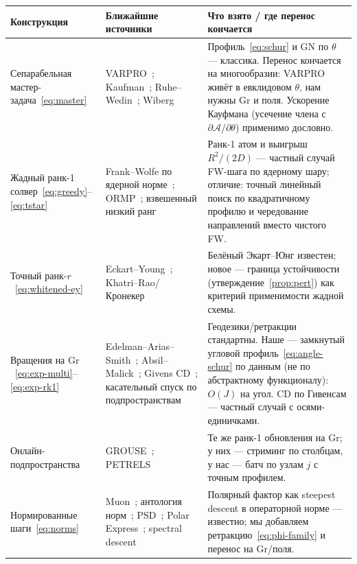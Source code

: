 \documentclass[11pt,a4paper]{article}
\newcommand{\Gr}{\mathrm{Gr}}
\newcommand{\Aop}{\mathcal{A}}
\theoremstyle{plain}
\theoremstyle{definition}
\theoremstyle{remark}
\begin{document}
\begin{center}
\small
\begin{tabularx}{\textwidth}{@{}p{3.6cm}p{4.6cm}X@{}}
\toprule
\textbf{Конструкция} & \textbf{Ближайшие источники} & \textbf{Что взято / где перенос кончается}\\
\midrule
Сепарабельная мастер-задача~\eqref{eq:master}
& VARPRO~\cite{golub-pereyra-1973}; Kaufman~\cite{kaufman-1975};
Ruhe--Wedin~\cite{ruhe-wedin-1980}; Wiberg~\cite{wiberg-1976}
& Профиль~\eqref{eq:schur} и GN по $\theta$ --- классика. Перенос кончается на
многообразии: VARPRO живёт в евклидовом $\theta$, нам нужны $\Gr$ и поля.
Ускорение Кауфмана (усечение члена с $\partial\Aop/\partial\theta$)
применимо дословно.\\[2pt]
Жадный ранк-1 солвер~\eqref{eq:greedy}--\eqref{eq:tstar}
& Frank--Wolfe по ядерной норме~\cite{jaggi-2013};
ORMP~\cite{wang-2014-ormp};
взвешенный низкий ранг~\cite{srebro-jaakkola-2003,mishra-2014}
& Ранк-1 атом и выигрыш $R^2/(2D)$ --- частный случай FW-шага по ядерному
шару; отличие: точный линейный поиск по квадратичному профилю и
чередование направлений вместо чистого FW.\\[2pt]
Точный ранк-$r$~\eqref{eq:whitened-ey}
& Eckart--Young~\cite{eckart-young-1936};
Khatri--Rao/Кронекер~\cite{vanloan-pitsianis-1993}
& Белёный Экарт--Юнг известен; новое --- граница устойчивости
(утверждение~\ref{prop:pert}) как критерий применимости жадной схемы.\\[2pt]
Вращения на $\Gr$~\eqref{eq:exp-multi}--\eqref{eq:exp-rk1}
& Edelman--Arias--Smith~\cite{edelman-1998};
Absil--Malick~\cite{absil-malick-2012};
Givens CD~\cite{shalit-chechik-2014,massart-2022};
касательный спуск по подпространствам~\cite{gutman-2019-tsd}
& Геодезики/ретракции стандартны. Наше --- замкнутый угловой
профиль~\eqref{eq:angle-schur} по данным (не по абстрактному функционалу):
$O(J)$ на угол. CD по Гивенсам --- частный случай с осями-единичками.\\[2pt]
Онлайн-подпространства
& GROUSE~\cite{balzano-2010-grouse}; PETRELS~\cite{chi-2013-petrels}
& Те же ранк-1 обновления на $\Gr$; у них --- стриминг по столбцам, у нас ---
батч по узлам $j$ с точным профилем.\\[2pt]
Нормированные шаги~\eqref{eq:norms}
& Muon~\cite{jordan-2024-muon}; антология
норм~\cite{bernstein-newhouse-2024};
PSD~\cite{carlson-2015}; Polar Express~\cite{amsel-2025-polar};
spectral descent
& Полярный фактор как steepest descent в операторной норме --- известно;
мы добавляем ретракцию~\eqref{eq:phi-family} и перенос на $\Gr$/поля.\\[2pt]

\end{tabularx}
\end{center}
\end{document}
